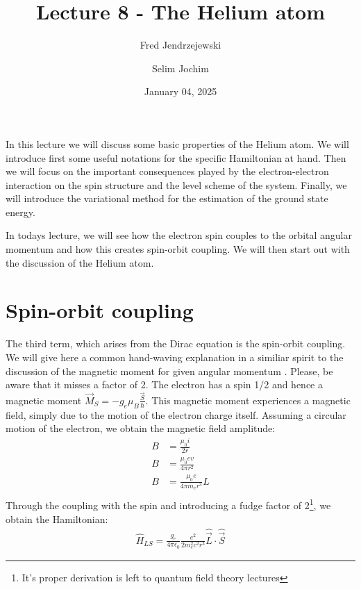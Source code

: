\documentclass[10pt]{article}
\let\cite\citep
\renewenvironment{abstract}
  {{\bfseries\noindent{\abstractname}\par\nobreak}\footnotesize}
  {\bigskip}
\providecommand\citep{\cite}
\begin{document}
\title{Lecture 8 - The Helium atom}



\author[1]{Fred Jendrzejewski}%
\author[2]{Selim Jochim}%
%
%


\vspace{-1em}



  
  \date{January 04, 2025}


\begingroup
\let\center\flushleft
\let\endcenter\endflushleft
\maketitle
\endgroup





\begin{abstract}
In this lecture we will discuss some basic properties of the Helium atom. We will introduce first some useful notations for the specific Hamiltonian at hand. Then we will focus on the important consequences played by the electron-electron interaction on the spin structure and the level scheme of the system. Finally, we will introduce the variational method for the estimation of the ground state energy.%
\end{abstract}%



\sloppy


In todays lecture, we will see how the electron spin couples to the orbital angular momentum and how this creates spin-orbit coupling. We will then start out with the discussion of the Helium atom.

\section{Spin-orbit coupling}

The third term, which arises from the Dirac equation is the spin-orbit coupling. We will give here a common hand-waving explanation in a similiar spirit to the discussion of the magnetic moment for given angular momentum \cite{Demtr_der_2010}. Please, be aware that it misses a factor of 2. The electron has a spin 1/2 and hence a magnetic moment $\vec{M}_S = -g_e \mu_B \frac{\vec{S}}{\hbar}$. This magnetic moment experiences a magnetic field, simply due to the motion of the electron charge itself. Assuming a circular motion of the electron, we obtain the magnetic field amplitude:
\begin{align}
B &= \frac{\mu_0 i}{2r}\\
B &= \frac{\mu_0 ev}{4\pi r^2}\\
B &= \frac{\mu_0 e}{4\pi m_e r^3}L\\
\end{align}
Through the coupling with the spin and introducing a fudge factor of 2\footnote{It's proper derivation is left to quantum field theory lectures}, we obtain the Hamiltonian:
\begin{align}\label{Eq:HamLS}
\hat{H}_{LS} = \frac{g_e}{4\pi \epsilon_0}\frac{e^2}{2m_e^2c^2 r^3}  \hat{\vec{L}}\cdot \hat{\vec{S}}
\end{align}
\end{document}

